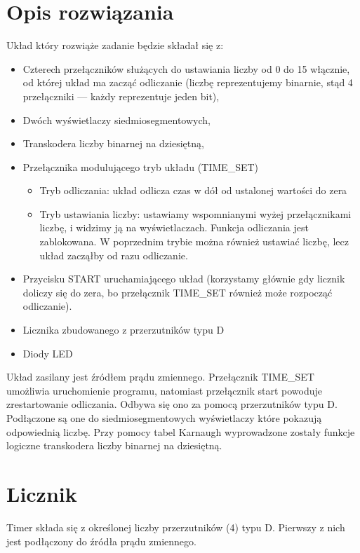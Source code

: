 \documentclass{article}
\begin{document}
    \section{Opis rozwiązania}
    Układ który rozwiąże zadanie będzie składał się z:
    \begin{itemize}
        \item Czterech przełączników służących do ustawiania liczby od 0 do 15 włącznie, od której układ ma zacząć odliczanie 
        (liczbę reprezentujemy binarnie, stąd 4 przełączniki --- każdy reprezentuje jeden bit),
        \item Dwóch wyświetlaczy siedmiosegmentowych,
        \item Transkodera liczby binarnej na dziesiętną,
        \item Przełącznika modulującego tryb układu (TIME\_SET) \begin{itemize}
            \item Tryb odliczania: układ odlicza czas w dół od ustalonej wartości do zera
            \item Tryb ustawiania liczby: ustawiamy wspomnianymi wyżej przełącznikami liczbę, i widzimy ją na wyświetlaczach. Funkcja odliczania jest zablokowana.
            W poprzednim trybie można również ustawiać liczbę, lecz układ zacząłby od razu odliczanie.
        \end{itemize}
        \item Przycisku START uruchamiającego układ (korzystamy głównie gdy licznik doliczy się do zera, bo przełącznik TIME\_SET również może rozpocząć odliczanie).
        \item Licznika zbudowanego z przerzutników typu D
        \item Diody LED
    \end{itemize}
    Układ zasilany jest źródłem prądu zmiennego. Przełącznik TIME\_SET umożliwia uruchomienie programu, natomiast przełącznik
    start powoduje zrestartowanie odliczania. Odbywa się ono za pomocą przerzutników typu D. Podłączone są one do siedmiosegmentowych
    wyświetlaczy które pokazują odpowiednią liczbę. Przy pomocy tabel Karnaugh wyprowadzone zostały funkcje logiczne transkodera liczby binarnej na dziesiętną.

    \section{Licznik}
    Timer składa się z określonej liczby przerzutników (4) typu D. Pierwszy z nich jest podłączony do źródła prądu zmiennego. 
\end{document}
